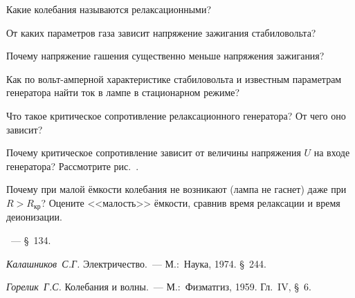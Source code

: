 \begin{lab:questions}
	\item Какие колебания называются релаксационными?

	\item От каких параметров газа зависит напряжение зажигания стабиловольта?

	\item Почему напряжение гашения существенно меньше напряжения зажигания?


	\item Как по вольт-амперной характеристике стабиловольта и известным
параметрам генератора найти ток в лампе в стационарном
режиме?

	\item Что такое критическое сопротивление релаксационного генератора? От
чего оно зависит?

	\item Почему критическое сопротивление зависит от величины напряжения $U$ на
входе генератора? Рассмотрите рис.~.

	\item Почему при малой ёмкости колебания не возникают (лампа не гаснет) даже
при $R>R_{\text{кр}}$? Оцените <<малость>> ёмкости,
сравнив время релаксации и время деионизации.
\end{lab:questions}


\begin{lab:literature}

	\item \SivuhinIII~--- \S~134.

	\item \emph{Калашников~С.Г.} Электричество.~--- М.:~Наука, 1974. \S~244.

	\item \emph{Горелик~Г.С.} Колебания и волны.~--- М.:~Физматгиз, 1959.
Гл.~IV, \S~6.
\end{lab:literature}
